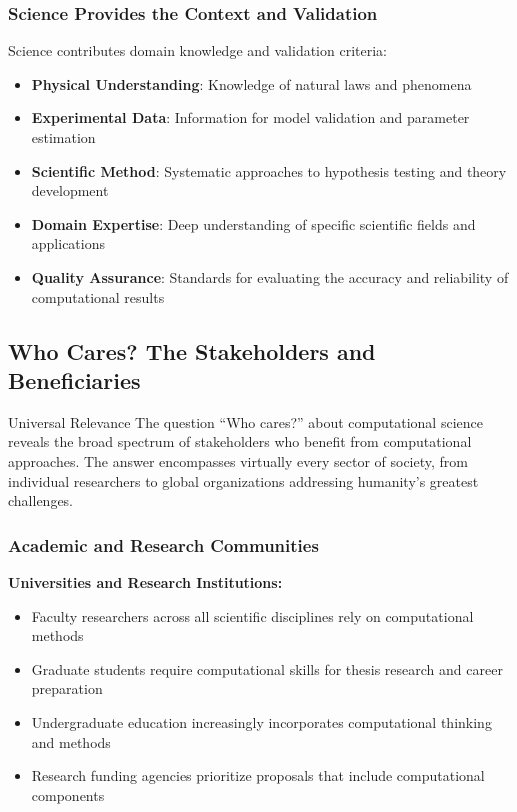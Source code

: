 \subsubsection{Science Provides the Context and Validation}

Science contributes domain knowledge and validation criteria:
\begin{itemize}
    \item \textbf{Physical Understanding}: Knowledge of natural laws and phenomena
    \item \textbf{Experimental Data}: Information for model validation and parameter estimation
    \item \textbf{Scientific Method}: Systematic approaches to hypothesis testing and theory development
    \item \textbf{Domain Expertise}: Deep understanding of specific scientific fields and applications
    \item \textbf{Quality Assurance}: Standards for evaluating the accuracy and reliability of computational results
\end{itemize}

\subsection{Who Cares? The Stakeholders and Beneficiaries}

\begin{conceptcard}{Universal Relevance}
The question ``Who cares?'' about computational science reveals the broad spectrum of stakeholders who benefit from computational approaches. The answer encompasses virtually every sector of society, from individual researchers to global organizations addressing humanity's greatest challenges.
\end{conceptcard}

\subsubsection{Academic and Research Communities}

\textbf{Universities and Research Institutions:}
\begin{itemize}
    \item Faculty researchers across all scientific disciplines rely on computational methods
    \item Graduate students require computational skills for thesis research and career preparation
    \item Undergraduate education increasingly incorporates computational thinking and methods
    \item Research funding agencies prioritize proposals that include computational components
\end{itemize}

